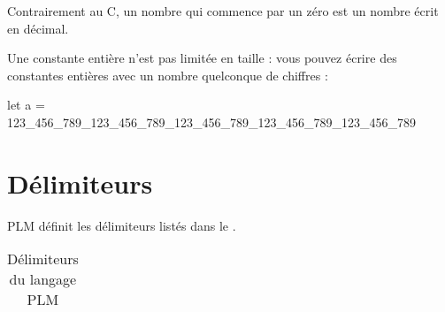 Contrairement au C, un nombre qui commence par un zéro est un nombre écrit en décimal.

Une constante entière n'est pas limitée en taille : vous pouvez écrire des constantes entières avec un nombre quelconque de chiffres :

\begin{PLM}
let a = 123_456_789_123_456_789_123_456_789_123_456_789_123_456_789
\end{PLM}





\section{Délimiteurs}

PLM définit les délimiteurs listés dans le .

\begin{table}[!t]
  \centering
  \begin{tabular}{llllllllllllll}
    
  \end{tabular}
  \caption{Délimiteurs du langage PLM}
  \ligne
\end{table}













